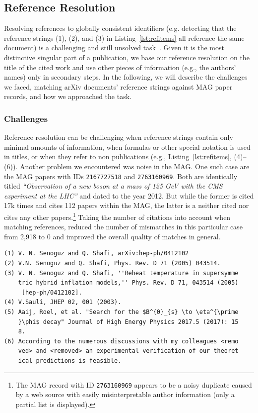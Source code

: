 \subsection{Reference Resolution}
\label{sec:refresol}
Resolving references to globally consistent identifiers (e.g. detecting that the reference strings (1), (2), and (3) in Listing~\ref{lst:refitems} all reference the same document) is a challenging and still unsolved task~\cite{Nasar2018}. Given it is the most distinctive singular part of a publication, we base our reference resolution on the title of the cited work and use other pieces of information (e.g., the authors' names) only in secondary steps. In the following, we will describe the challenges we faced, matching arXiv documents' reference strings against MAG paper records, and how we approached the task.

\subsubsection{Challenges}
Reference resolution can be challenging when reference strings contain only minimal amounts of information, when formulas or other special notation is used in titles, or when they refer to non publications (e.g., Listing~\ref{lst:refitems}, (4)--(6)).  Another problem we encountered was noise in the MAG. One such case are the MAG papers with IDs \texttt{2167727518} and \texttt{2763160969}. Both are identically titled \emph{``Observation of a new boson at a mass of 125 GeV with the CMS experiment at the LHC''} and dated to the year 2012. But while the former is cited 17k times and cites 112 papers within the MAG, the latter is a neither cited nor cites any other papers.\footnote{The MAG record with ID \texttt{2763160969} appears to be a noisy duplicate caused by a web source with easily misinterpretable author information (only a partial list is displayed).} Taking the number of citations into account when matching references, reduced the number of mismatches in this particular case from 2,918 to 0 and improved the overall quality of matches in general.

\begin{lstlisting}[caption={Examples of reference strings},label={lst:refitems}]
(1) V. N. Senoguz and Q. Shafi, arXiv:hep-ph/0412102
(2) V.N. Senoguz and Q. Shafi, Phys. Rev. D 71 (2005) 043514.
(3) V. N. Senoguz and Q. Shafi, ''Reheat temperature in supersymme
    tric hybrid inflation models,'' Phys. Rev. D 71, 043514 (2005)
     [hep-ph/0412102].
(4) V.Sauli, JHEP 02, 001 (2003).
(5) Aaij, Roel, et al. "Search for the $B^{0}_{s} \to \eta^{\prime
    }\phi$ decay" Journal of High Energy Physics 2017.5 (2017): 15
    8.
(6) According to the numerous discussions with my colleagues <remo
    ved> and <removed> an experimental verification of our theoret
    ical predictions is feasible.
\end{lstlisting}

